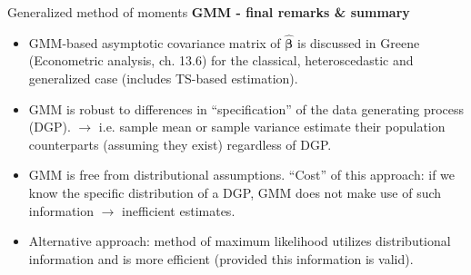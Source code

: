 \documentclass{beamer}
\begin{document}
\begin{frame}{Generalized method of moments}
\textbf{GMM - final remarks \& summary}\\
\begin{itemize}
\item GMM-based asymptotic covariance matrix of $\hat{\bm{\beta}}$ is discussed in Greene (Econometric analysis, ch. 13.6) for the classical, heteroscedastic and generalized case (includes TS-based estimation).
\medskip
\item GMM is robust to differences in ``specification'' of the data generating process (DGP). $\rightarrow$ i.e. sample mean or sample variance estimate their population counterparts (assuming they exist) regardless of DGP.
\medskip
\item GMM is free from distributional assumptions. ``Cost'' of this approach: if we know the specific distribution of a DGP, GMM does not make use of such information $\rightarrow$ inefficient estimates.
\medskip 
\item Alternative approach: method of maximum likelihood utilizes distributional information and is more efficient (provided this information is valid).
\end{itemize}
\end{frame}
\end{document}
